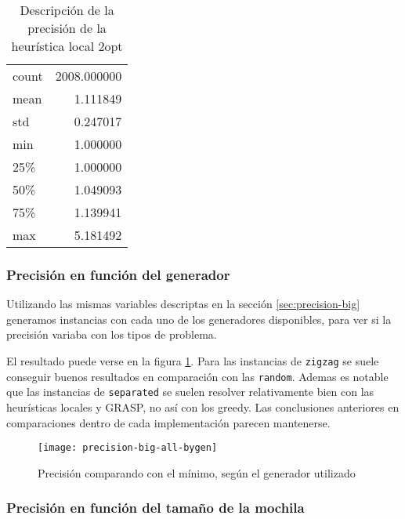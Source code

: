 \begin{table}[H]
    \begin{center}
        \begin{tabular}{ l | r }
            count  & 2008.000000 \\
            mean   &    1.111849 \\
            std    &    0.247017 \\
            min    &    1.000000 \\
            25\%   &    1.000000 \\
            50\%   &    1.049093 \\
            75\%   &    1.139941 \\
            max    &    5.181492 \\
        \end{tabular}
        \caption{Descripción de la precisión de la heurística local 2opt}\label{tab:precision-big-local-2opt}
    \end{center}
\end{table}

\subsubsection{Precisión en función del generador}

Utilizando las mismas variables descriptas en la sección \ref{sec:precision-big} generamos instancias con cada uno de los generadores disponibles, para ver si la precisión variaba con los tipos de problema.

El resultado puede verse en la figura \ref{fig:precision-big-all-bygen}.
Para las instancias de \texttt{zigzag} se suele conseguir buenos resultados en comparación con las \texttt{random}.
Ademas es notable que las instancias de \texttt{separated} se suelen resolver relativamente bien con las heurísticas locales y GRASP, no así con los greedy. Las conclusiones anteriores en comparaciones dentro de cada implementación parecen mantenerse.

\begin{figure}[H]
    \centering
    \texttt{[image: precision-big-all-bygen]}
    \caption{Precisión comparando con el mínimo, según el generador utilizado}
    \label{fig:precision-big-all-bygen}
\end{figure}

\subsubsection{Precisión en función del tamaño de la mochila}

